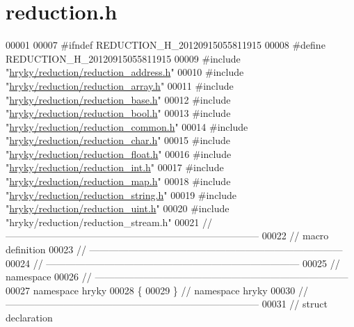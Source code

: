 \hypertarget{reduction_8h_source}{\section{reduction.\-h}
}

\begin{DoxyCode}
00001 
00007 \textcolor{preprocessor}{#ifndef REDUCTION\_H\_20120915055811915}
00008 \textcolor{preprocessor}{}\textcolor{preprocessor}{#define REDUCTION\_H\_20120915055811915}
00009 \textcolor{preprocessor}{}\textcolor{preprocessor}{#include "\hyperlink{reduction__address_8h}{hryky/reduction/reduction_address.h}"}
00010 \textcolor{preprocessor}{#include "\hyperlink{reduction__array_8h}{hryky/reduction/reduction_array.h}"}
00011 \textcolor{preprocessor}{#include "\hyperlink{reduction__base_8h}{hryky/reduction/reduction_base.h}"}
00012 \textcolor{preprocessor}{#include "\hyperlink{reduction__bool_8h}{hryky/reduction/reduction_bool.h}"}
00013 \textcolor{preprocessor}{#include "\hyperlink{reduction__common_8h}{hryky/reduction/reduction_common.h}"}
00014 \textcolor{preprocessor}{#include "\hyperlink{reduction__char_8h}{hryky/reduction/reduction_char.h}"}
00015 \textcolor{preprocessor}{#include "\hyperlink{reduction__float_8h}{hryky/reduction/reduction_float.h}"}
00016 \textcolor{preprocessor}{#include "\hyperlink{reduction__int_8h}{hryky/reduction/reduction_int.h}"}
00017 \textcolor{preprocessor}{#include "\hyperlink{reduction__map_8h}{hryky/reduction/reduction_map.h}"}
00018 \textcolor{preprocessor}{#include "\hyperlink{reduction__string_8h}{hryky/reduction/reduction_string.h}"}
00019 \textcolor{preprocessor}{#include "\hyperlink{reduction__uint_8h}{hryky/reduction/reduction_uint.h}"}
00020 \textcolor{preprocessor}{#include "hryky/reduction/reduction\_stream.h"}
00021 \textcolor{comment}{//
      ------------------------------------------------------------------------------}
00022 \textcolor{comment}{// macro definition}
00023 \textcolor{comment}{//
      ------------------------------------------------------------------------------}
00024 \textcolor{comment}{//
      ------------------------------------------------------------------------------}
00025 \textcolor{comment}{// namespace}
00026 \textcolor{comment}{//
      ------------------------------------------------------------------------------}
00027 \textcolor{keyword}{namespace }hryky
00028 \{
00029 \} \textcolor{comment}{// namespace hryky}
00030 \textcolor{comment}{//
      ------------------------------------------------------------------------------}
00031 \textcolor{comment}{// struct declaration}

\end{DoxyCode}
